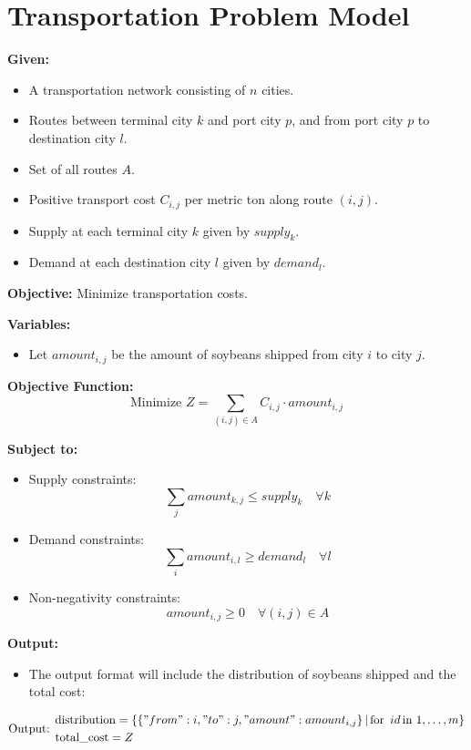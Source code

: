 \documentclass{article}
\begin{document}
\section*{Transportation Problem Model}

\textbf{Given:}
\begin{itemize}
    \item A transportation network consisting of \( n \) cities.
    \item Routes between terminal city \( k \) and port city \( p \), and from port city \( p \) to destination city \( l \).
    \item Set of all routes \( A \).
    \item Positive transport cost \( C_{i,j} \) per metric ton along route \( (i,j) \).
    \item Supply at each terminal city \( k \) given by \( supply_k \).
    \item Demand at each destination city \( l \) given by \( demand_l \).
\end{itemize}

\textbf{Objective:} Minimize transportation costs.

\textbf{Variables:}
\begin{itemize}
    \item Let \( amount_{i,j} \) be the amount of soybeans shipped from city \( i \) to city \( j \).
\end{itemize}

\textbf{Objective Function:}
\[
\text{Minimize } Z = \sum_{(i,j) \in A} C_{i,j} \cdot amount_{i,j}
\]

\textbf{Subject to:}
\begin{itemize}
    \item Supply constraints:
    \[
    \sum_{j} amount_{k,j} \leq supply_k \quad \forall k
    \]
    
    \item Demand constraints:
    \[
    \sum_{i} amount_{i,l} \geq demand_l \quad \forall l
    \]

    \item Non-negativity constraints:
    \[
    amount_{i,j} \geq 0 \quad \forall (i,j) \in A
    \]
\end{itemize}

\textbf{Output:}
\begin{itemize}
    \item The output format will include the distribution of soybeans shipped and the total cost:
\end{itemize}
\[
\text{Output: } 
\begin{align*}
    & \text{distribution} = \{ \{ "from": i, "to": j, "amount": amount_{i,j} \} \, | \, \text{for } \, id \, \text{in } 1, \ldots, m \} \\
    & \text{total\_cost} = Z
\end{align*}
\]
\end{document}
